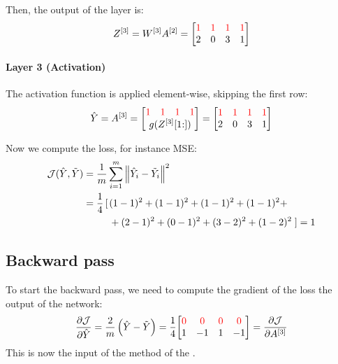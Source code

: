 Then, the output of the layer is:
\begin{equation*}
    Z^{[3]} = W^{[3]} A^{[2]} = \mqty[
        \color{red} 1 & \color{red} 1 & \color{red} 1 & \color{red} 1 \\
        2 & 0 & 3 & 1
    ]
\end{equation*}

\paragraph{Layer 3 (Activation)} The activation function is applied element-wise, skipping the first row:
\begin{equation*}
    \hat{Y} = A^{[3]} = \mqty[
        \mqty{\color{red} 1 & \color{red} 1 & \color{red} 1 & \color{red} 1} \\
        g(Z^{[3]}[1\hspace{-0.6ex}:])
    ] = \mqty[
        \color{red} 1 & \color{red} 1 & \color{red} 1 & \color{red} 1 \\
        2 & 0 & 3 & 1
    ]
\end{equation*}

Now we compute the loss, for instance \ac{MSE}:
\begin{align*}
    \mathcal{J}(\hat{Y}, \tilde{Y}) &= \frac{1}{m} \sum_{i=1}^{m} \norm{\hat{Y}_i - \tilde{Y}_i}^2\\
    &\;\begin{aligned}
        = \frac{1}{4} \left[\right.&(1 - 1)^2 + (1 - 1)^2 + (1 - 1)^2 + (1 - 1)^2 + \\
        &+ (2 - 1)^2 + (0 - 1)^2 + (3 - 2)^2 + (1 - 2)^2\left.\right] = 1
    \end{aligned}
\end{align*}

\subsection{Backward pass}
To start the backward pass, we need to compute the gradient of the loss \wrt the output of the network:
\begin{equation*}
    \frac{\partial \J}{\partial \hat{Y}} = \frac{2}{m} \left(\hat{Y} - \tilde{Y}\right) = \frac{1}{4} \mqty[
        \color{red} 0 & \color{red} 0 & \color{red} 0 & \color{red} 0 \\
        1 & -1 & 1 & -1
    ] = \pdv{\J}{A^{[3]}}
\end{equation*}
This is now the input of the  method of the .

